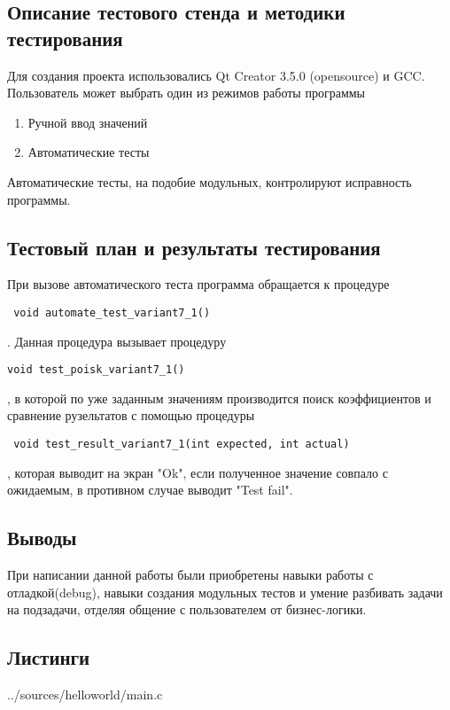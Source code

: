 \documentclass[12pt,a4paper]{report}
\begin{document}
\subsection{Описание тестового стенда и методики тестирования}

Для создания проекта использовались Qt Creator 3.5.0 (opensource) и GCC.
Пользователь может выбрать один из режимов работы программы

\begin{enumerate}
\item Ручной ввод значений
\item Автоматические тесты
\end{enumerate}

Автоматические тесты, на подобие модульных, контролируют исправность программы.

\subsection{Тестовый план и результаты тестирования}
При вызове автоматического теста программа обращается к процедуре\begin{verbatim} void automate_test_variant7_1()\end{verbatim}. Данная процедура вызывает процедуру \begin{verbatim}void test_poisk_variant7_1()\end{verbatim}, в которой по уже заданным значениям производится поиск коэффициентов и сравнение рузельтатов с помощью процедуры\begin{verbatim} void test_result_variant7_1(int expected, int actual)\end{verbatim}, которая выводит на экран "Ok", если полученное значение совпало с ожидаемым, в противном случае выводит "Test fail".

\subsection{Выводы}

При написании данной работы были приобретены навыки работы с отладкой(debug), навыки создания модульных тестов и умение разбивать задачи на подзадачи, отделяя общение с пользователем от бизнес-логики.

\subsection*{Листинги}

{../sources/helloworld/main.c}
\end{document}
